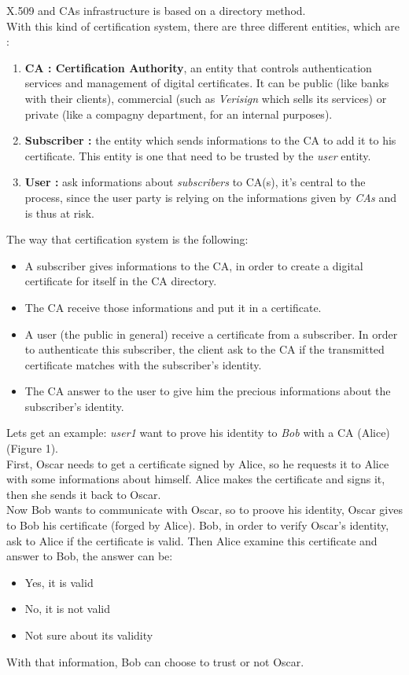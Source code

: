 \documentclass[journal, a4paper]{IEEEtran}
\begin{document}
X.509 and CAs\cite{rfc3647} infrastructure is based on a directory method.\\
With this kind of certification system, there are three different entities, which are :

\begin{enumerate}
	\item \textbf{CA : Certification Authority}, an entity that controls authentication services and management of digital certificates. It can be public (like banks with their clients), commercial (such as \textit{Verisign} which sells its services) or private (like a compagny department, for an internal purposes).
	\item \textbf{Subscriber :} the entity which sends informations to the CA to add it to his certificate. This entity is one that need to be trusted by the \textit{user} entity.
	\item \textbf{User :} ask informations about \textit{subscribers} to CA(s), it's central to the process, since the user party is relying on the informations given by \textit{CAs} and is thus at risk.
\end{enumerate}

The way that certification system is the following:
\begin{itemize}
	\item A subscriber gives informations to the CA, in order to create a digital certificate for itself in the CA directory.
	\item The CA receive those informations and put it in a certificate.
	\item A user (the public in general) receive a certificate from a subscriber. In order to authenticate this subscriber, the client ask to the CA if the transmitted certificate matches with the subscriber's identity.
	\item The CA answer to the user to give him the precious informations about the subscriber's identity.
\end{itemize}

Lets get an example: \textit{user1} want to prove his identity to \textit{Bob} with a CA (Alice) (Figure 1).\\
First, Oscar needs to get a certificate signed by Alice, so he requests it to Alice with some informations about himself. Alice makes the certificate and signs it, then she sends it back to Oscar.\\
Now Bob wants to communicate with Oscar, so to proove his identity, Oscar gives to Bob his certificate (forged by Alice). Bob, in order to verify Oscar's identity, ask to Alice if the certificate is valid. Then Alice examine this certificate and answer to Bob, the answer can be:
\begin{itemize}
	\item Yes, it is valid
	\item No, it is not valid
	\item Not sure about its validity
\end{itemize}
With that information, Bob can choose to trust or not Oscar.
\end{document}
